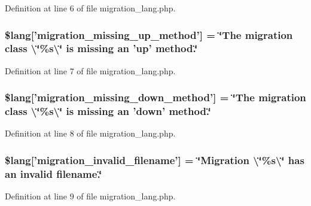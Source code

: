 Definition at line 6 of file migration\-\_\-lang.\-php.

\hypertarget{migration__lang_8php_a4bc9c60a4f078d1845d1d72370c363e8}{
\subsubsection[{\$lang}]{\setlength{\rightskip}{0pt plus 5cm}\$lang\mbox{[}'migration\-\_\-missing\-\_\-up\-\_\-method'\mbox{]} = \char`\"{}The migration class \textbackslash{}\char`\"{}\%s\textbackslash{}\char`\"{} is missing an 'up' method.\char`\"{}}}\label{migration__lang_8php_a4bc9c60a4f078d1845d1d72370c363e8}


Definition at line 7 of file migration\-\_\-lang.\-php.

\hypertarget{migration__lang_8php_a6e835ce0b327b8ea1df42bfc7a59f1cd}{
\subsubsection[{\$lang}]{\setlength{\rightskip}{0pt plus 5cm}\$lang\mbox{[}'migration\-\_\-missing\-\_\-down\-\_\-method'\mbox{]} = \char`\"{}The migration class \textbackslash{}\char`\"{}\%s\textbackslash{}\char`\"{} is missing an 'down' method.\char`\"{}}}\label{migration__lang_8php_a6e835ce0b327b8ea1df42bfc7a59f1cd}


Definition at line 8 of file migration\-\_\-lang.\-php.

\hypertarget{migration__lang_8php_a75ef7572f25674e4dd1e36a0d61080fa}{
\subsubsection[{\$lang}]{\setlength{\rightskip}{0pt plus 5cm}\$lang\mbox{[}'migration\-\_\-invalid\-\_\-filename'\mbox{]} = \char`\"{}Migration \textbackslash{}\char`\"{}\%s\textbackslash{}\char`\"{} has an invalid filename.\char`\"{}}}\label{migration__lang_8php_a75ef7572f25674e4dd1e36a0d61080fa}


Definition at line 9 of file migration\-\_\-lang.\-php.

